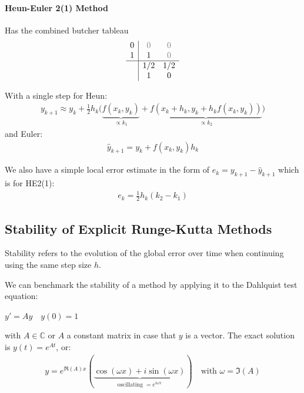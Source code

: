 \paragraph{Heun-Euler 2(1) Method}

Has the combined butcher tableau
\begin{align*}
    \begin{array}{c|cc}
        0 & {\color{gray}0} & {\color{gray}0} \\
        1 & 1 & {\color{gray}0} \\
        \hline
        & 1/2 & 1/2 \\
        & 1 & 0
    \end{array}
\end{align*}

With a single step for Heun:
\begin{align*}
    y_{k+1}\approx y_{k}+\frac{1}{2}h_{k}
    \Biggl(
        \underbrace{f(x_{k},y_{k})}_{\varpropto k_1}+\underbrace{f(x_{k}+h_{k},y_{k}+h_{k}f(x_{k},y_{k}))}_{\varpropto k_2}
    \Biggr)
\end{align*}
and Euler:
\begin{align*}
    \hat{y}_{k+1} = y_k + f(x_k,y_k)h_k
\end{align*}

We also have a simple local error estimate in the form of $e_k = y_{k+1} - \hat{y}_{k+1}$
which is for HE2(1):
\begin{align*}
    e_k = \frac{1}{2}h_k(k_2 - k_1)
\end{align*}

\subsection{Stability of Explicit Runge-Kutta Methods}

Stability refers to the evolution of the global error over time when
continuing using the same step size $h$.

We can benchmark the stability of a method by applying it to the Dahlquist test equation:

\colorbox{shadecolor}{$
\displaystyle
y' = Ay\quad y(0) = 1
$}

with $A\in\mathbb{C}$ or $A$ a constant matrix in case that $y$ is a vector.
The exact solution is $y(t) = e^{At}$, or:
\begin{align*}
    y = e^{\Re(A)x}\left(
    \underbrace{\cos(\omega x) + i\sin(\omega x)}_{\text{oscillating } = e^{i\omega x}}
    \right)
    \quad\text{with }\omega = \Im(A)
\end{align*}

